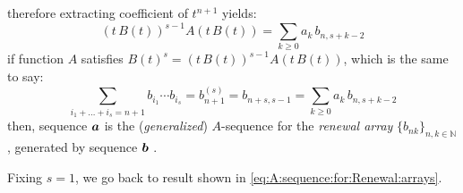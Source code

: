 therefore extracting coefficient of $t^{n+1}$ yields:
\begin{displaymath}
    [t^{n+1}](t\,B(t))^{s-1}A(t\,B(t))=\sum_{k\geq 0}{a_{k}\,b_{n,s+k-2}}
\end{displaymath}
if function $A$ satisfies 
$B(t)^{s}=(t\,B(t))^{s-1}A(t\,B(t))$, which is the same to say:
\begin{equation}
    \sum_{i_{1}+\ldots+i_{s}=n+1}{b_{i_{1}}\cdots b_{i_{s}}}
        =b_{n+1}^{(s)}
        =b_{n+s,s-1}
        =\sum_{k\geq 0}{a_{k}\,b_{n,s+k-2}}
    \label{eq:generalized:A:sequence:for:Renewal:arrays}
\end{equation}
then, sequence $\boldsymbol{a}$ is the (\emph{generalized}) $A$-sequence for the
\emph{renewal array} $\lbrace b_{nk}\rbrace_{n,k\in\mathbb{N}}$, generated by
sequence $\boldsymbol{b}$ .

Fixing $s=1$, we go back to result shown in
\autoref{eq:A:sequence:for:Renewal:arrays}.

















